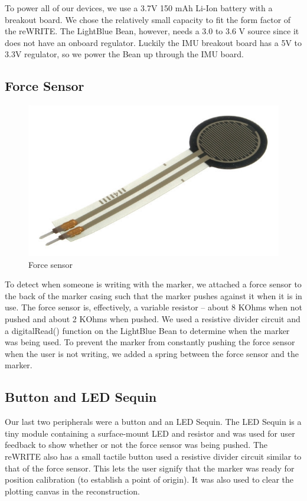 \documentclass[12pt,journal]{IEEEtran}
\begin{document}
	To power all of our devices, we use a 3.7V 150 mAh Li-Ion battery with a breakout board. We chose the relatively small capacity to fit the form factor of the reWRITE. The LightBlue Bean, however, needs a 3.0 to 3.6 V source since it does not have an onboard regulator. Luckily the IMU breakout board has a 5V to 3.3V regulator, so we power the Bean up through the IMU board.

\subsection{Force Sensor}

\begin{figure}[H]
  \centering
    \includegraphics[width=0.6\linewidth]{figures/force-sensor}
  \caption{Force sensor}
  \label{fig:system}
\end{figure}

	To detect when someone is writing with the marker, we attached a force sensor to the back of the marker casing such that the marker pushes against it when it is in use. The force sensor is, effectively, a variable resistor -- about 8 KOhms when not pushed and about 2 KOhms when pushed. We used a resistive divider circuit and a digitalRead() function on the LightBlue Bean to determine when the marker was being used. To prevent the marker from constantly pushing the force sensor when the user is not writing, we added a spring between the force sensor and the marker.

\subsection{Button and LED Sequin}
	Our last two peripherals were a button and an LED Sequin. The LED Sequin is a tiny module containing a surface-mount LED and resistor and was used for user feedback to show whether or not the force sensor was being pushed. The reWRITE also has a small tactile button used a resistive divider circuit similar to that of the force sensor. This lets the user signify that the marker was ready for position calibration (to establish a point of origin). It was also used to clear the plotting canvas in the reconstruction.
\end{document}
